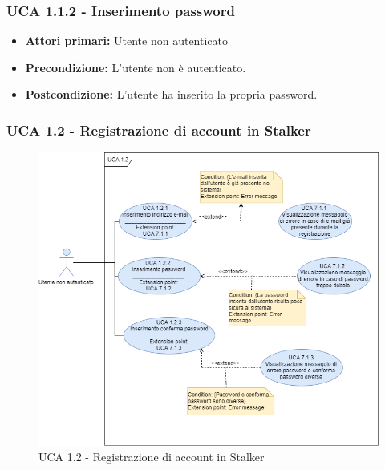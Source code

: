 \subsubsection{UCA 1.1.2 - Inserimento password}%
\begin{itemize}
\item \textbf{Attori primari:} Utente non autenticato
\item \textbf{Precondizione:} L'utente non è autenticato.
\item \textbf{Postcondizione:} L'utente ha inserito la propria password.
\end{itemize}


\subsubsection{UCA 1.2 - Registrazione di account in Stalker}%

\begin{figure}[h]
  \centering
    \includegraphics[scale=0.5]{sezioni/UseCase/Immagini/UCA1.2.png}
  \caption{UCA 1.2 -  Registrazione di account in Stalker}
\end{figure}

